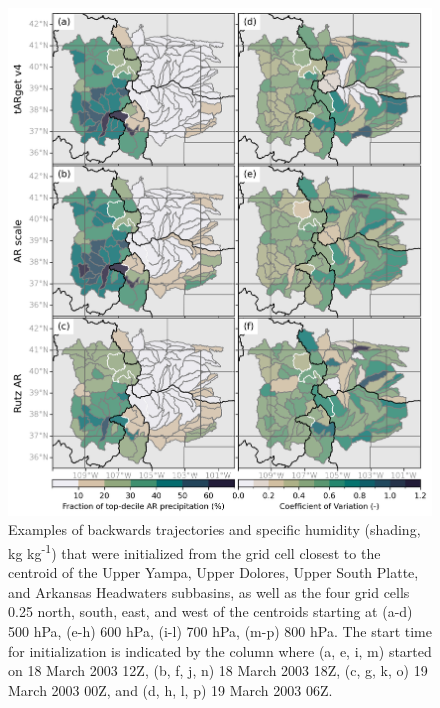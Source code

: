 \documentclass[draft]{agujournal2019}
\begin{document}
\begin{figure}
\noindent\includegraphics[width=\textwidth, height=\textheight, keepaspectratio]{fig3.png}
\caption{Examples of backwards trajectories and specific humidity (shading, kg kg\textsuperscript{-1}) that were initialized from the grid cell closest to the centroid of the Upper Yampa, Upper Dolores, Upper South Platte, and Arkansas Headwaters subbasins, as well as the four grid cells 0.25\textdegree{} north, south, east, and west of the centroids starting at (a-d) 500 hPa, (e-h) 600 hPa, (i-l) 700 hPa, (m-p) 800 hPa. The start time for initialization is indicated by the column where (a, e, i, m) started on 18 March 2003 12Z, (b, f, j, n) 18 March 2003 18Z, (c, g, k, o) 19 March 2003 00Z, and (d, h, l, p) 19 March 2003 06Z.}
\label{fig:sensitivity_tests}
\end{figure}
\end{document}
